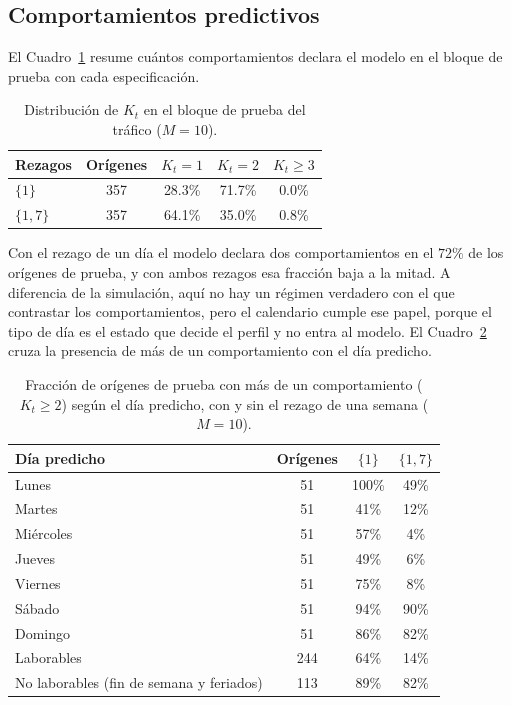 \subsection{Comportamientos predictivos}
\label{04_03_03_comportamientos}

El Cuadro~\ref{tab:apl_K} resume cuántos comportamientos declara el modelo en el bloque de prueba con cada especificación.

\begin{table}[H]
\centering\small
\setlength{\tabcolsep}{3.5pt}
\caption{Distribución de $K_t$ en el bloque de prueba del tráfico ($M = 10$).}
\label{tab:apl_K}
\begin{tabular}{l c ccc}
\hline
Rezagos & Orígenes & $K_t = 1$ & $K_t = 2$ & $K_t \ge 3$ \\
\hline
$\{1\}$ & 357 & 28.3\% & 71.7\% & 0.0\% \\
$\{1,7\}$ & 357 & 64.1\% & 35.0\% & 0.8\% \\
\hline
\end{tabular}
\end{table}

Con el rezago de un día el modelo declara dos comportamientos en el $72\%$ de los orígenes de prueba, y con ambos rezagos esa fracción baja a la mitad. A diferencia de la simulación, aquí no hay un régimen verdadero con el que contrastar los comportamientos, pero el calendario cumple ese papel, porque el tipo de día es el estado que decide el perfil y no entra al modelo. El Cuadro~\ref{tab:apl_K_calendario} cruza la presencia de más de un comportamiento con el día predicho.

\begin{table}[H]
\centering\small
\caption{Fracción de orígenes de prueba con más de un comportamiento ($K_t \ge 2$) según el día predicho, con y sin el rezago de una semana ($M = 10$).}
\label{tab:apl_K_calendario}
\begin{tabular}{l c cc}
\hline
Día predicho & Orígenes & $\{1\}$ & $\{1,7\}$ \\
\hline
Lunes     & 51  & 100\% & 49\% \\
Martes    & 51  & 41\%  & 12\% \\
Miércoles & 51  & 57\%  & 4\%  \\
Jueves    & 51  & 49\%  & 6\%  \\
Viernes   & 51  & 75\%  & 8\%  \\
Sábado    & 51  & 94\%  & 90\% \\
Domingo   & 51  & 86\%  & 82\% \\
\hline
Laborables    & 244 & 64\% & 14\% \\
No laborables (fin de semana y feriados) & 113 & 89\% & 82\% \\
\hline
\end{tabular}
\end{table}

